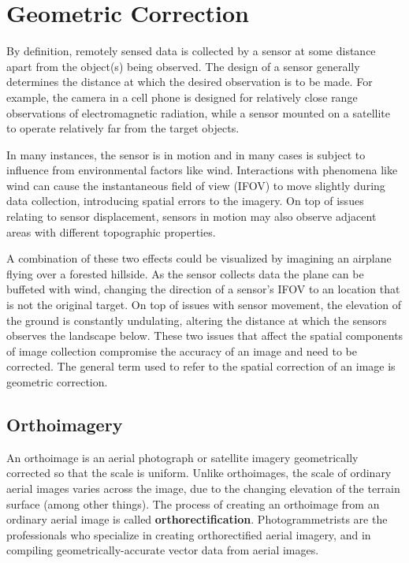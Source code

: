 \documentclass[
]{book}
\begin{document}
\hypertarget{geometric-correction}{%
\section{Geometric Correction}\label{geometric-correction}}

By definition, remotely sensed data is collected by a sensor at some distance apart from the object(s) being observed. The design of a sensor generally determines the distance at which the desired observation is to be made. For example, the camera in a cell phone is designed for relatively close range observations of electromagnetic radiation, while a sensor mounted on a satellite to operate relatively far from the target objects.

In many instances, the sensor is in motion and in many cases is subject to influence from environmental factors like wind. Interactions with phenomena like wind can cause the instantaneous field of view (IFOV) to move slightly during data collection, introducing spatial errors to the imagery. On top of issues relating to sensor displacement, sensors in motion may also observe adjacent areas with different topographic properties.

A combination of these two effects could be visualized by imagining an airplane flying over a forested hillside. As the sensor collects data the plane can be buffeted with wind, changing the direction of a sensor's IFOV to an location that is not the original target. On top of issues with sensor movement, the elevation of the ground is constantly undulating, altering the distance at which the sensors observes the landscape below. These two issues that affect the spatial components of image collection compromise the accuracy of an image and need to be corrected. The general term used to refer to the spatial correction of an image is geometric correction.

\hypertarget{orthoimagery}{%
\subsection{Orthoimagery}\label{orthoimagery}}

An orthoimage is an aerial photograph or satellite imagery geometrically corrected so that the scale is uniform. Unlike orthoimages, the scale of ordinary aerial images varies across the image, due to the changing elevation of the terrain surface (among other things). The process of creating an orthoimage from an ordinary aerial image is called \textbf{orthorectification}. Photogrammetrists are the professionals who specialize in creating orthorectified aerial imagery, and in compiling geometrically-accurate vector data from aerial images.
\end{document}
